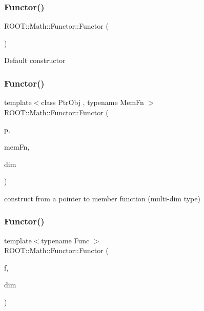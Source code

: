 \subsubsection{\texorpdfstring{Functor()}{Functor()}\hspace{0.1cm}{\footnotesize\ttfamily [9/12]}}
{\footnotesize\ttfamily R\+O\+O\+T\+::\+Math\+::\+Functor\+::\+Functor (\begin{DoxyParamCaption}{ }\end{DoxyParamCaption})\hspace{0.3cm}{\ttfamily [inline]}}

Default constructor \mbox{\label{classROOT_1_1Math_1_1Functor_ad6dbce8351bd8c74e6754215a3ccac41}} 
\subsubsection{\texorpdfstring{Functor()}{Functor()}\hspace{0.1cm}{\footnotesize\ttfamily [10/12]}}
{\footnotesize\ttfamily template$<$class Ptr\+Obj , typename Mem\+Fn $>$ \\
R\+O\+O\+T\+::\+Math\+::\+Functor\+::\+Functor (\begin{DoxyParamCaption}\item[{const Ptr\+Obj \&}]{p,  }\item[{Mem\+Fn}]{mem\+Fn,  }\item[{unsigned int}]{dim }\end{DoxyParamCaption})\hspace{0.3cm}{\ttfamily [inline]}}

construct from a pointer to member function (multi-\/dim type) \mbox{\label{classROOT_1_1Math_1_1Functor_a82af0df828055f18310af5d49dcc3aa2}} 
\subsubsection{\texorpdfstring{Functor()}{Functor()}\hspace{0.1cm}{\footnotesize\ttfamily [11/12]}}
{\footnotesize\ttfamily template$<$typename Func $>$ \\
R\+O\+O\+T\+::\+Math\+::\+Functor\+::\+Functor (\begin{DoxyParamCaption}\item[{const Func \&}]{f,  }\item[{unsigned int}]{dim }\end{DoxyParamCaption})\hspace{0.3cm}{\ttfamily [inline]}}


